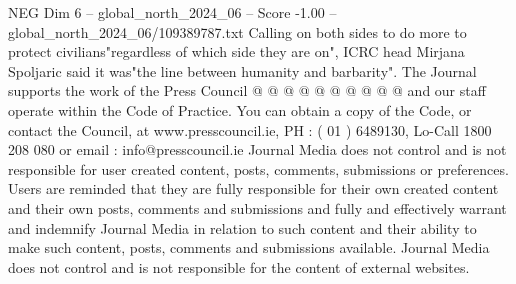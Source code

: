 \begin{textsample}{NEG Dim 6 – global\_north\_2024\_06 – Score -1.00 – global\_north\_2024\_06/109389787.txt}
Calling on both sides to do more to protect civilians"regardless of which side they are on", ICRC head Mirjana Spoljaric said it was"the line between humanity and barbarity".
The Journal supports the work of the Press Council @ @ @ @ @ @ @ @ @ @ and our staff operate within the Code of Practice.
You can obtain a copy of the Code, or contact the Council, at www.presscouncil.ie, PH : ( 01 ) 6489130, Lo-Call 1800 208 080 or email : info@presscouncil.ie Journal Media does not control and is not responsible for user created content, posts, comments, submissions or preferences.
Users are reminded that they are fully responsible for their own created content and their own posts, comments and submissions and fully and effectively warrant and indemnify Journal Media in relation to such content and their ability to make such content, posts, comments and submissions available.
Journal Media does not control and is not responsible for the content of external websites.

\end{textsample}
